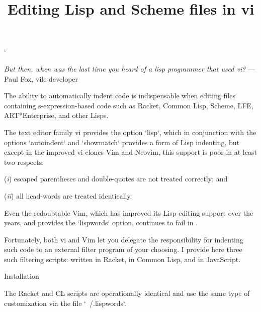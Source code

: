 


\overfullrule 0pt
\def\TZPhsize{450pt}
\activettchar`
\def\item#1{({\it #1\/})}
\title{Editing Lisp and Scheme files in vi}

\ifx\shipout\UnDeFiNeD
\centerline{}
\fi

\centerline{}

\medskip

{\obeylines\raggedleft
\ifx\shipout\UnDeFiNeD\small\fi
{\it But then, when was the last time you heard
of a lisp programmer that used vi?}
— Paul Fox, vile developer
}

\bigskip

The ability to automatically indent code is indispensable when editing
files containing s-expression-based code such as Racket, Common Lisp, Scheme,
LFE,
ART*Enterprise, and other Lisps.

The text editor family vi provides the option `lisp`, which in
conjunction with the options `autoindent` and `showmatch`
provides a form of Lisp indenting, but except in the improved vi
clones
Vim and Neovim, this support is poor in at least two respects:

\item{i} escaped
parentheses and double-quotes are not treated correctly; and

\item{ii} all
head-words are
treated identically.

Even the redoubtable Vim, which has improved its Lisp editing
support over the years, and provides the `lispwords` option, continues to fail in
.

Fortunately, both vi and Vim let you delegate the responsibility
for indenting such code to an external filter program of your
choosing.  I provide here three such filtering scripts:
written in Racket,
 in Common
Lisp, and
 in JavaScript.

\beginsection Installation

The Racket
and CL scripts are
operationally identical and use the same type of customization
via the file `~/.lispwords`.

